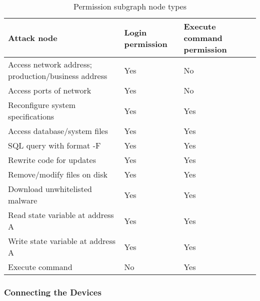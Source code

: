 \documentclass[10pt,journal,compsoc]{IEEEtran}
\begin{document}
\begin {table}[h]
\caption {Permission subgraph node types}
\begin{tabular}{|m{4.7cm}|m{1.5cm}|m{1.5cm}|}
\hline
\textbf{Attack node} & \textbf{Login permission} & \textbf{Execute command permission} \\ \hline
Access network address; production/business address & Yes & No \\ \hline
Access ports of network & Yes & No \\ \hline
Reconfigure system specifications & Yes & Yes \\ \hline
Access database/system files & Yes & Yes \\ \hline
SQL query with format -F & Yes & Yes \\ \hline
Rewrite code for updates & Yes & Yes \\ \hline
Remove/modify files on disk & Yes & Yes \\ \hline
Download unwhitelisted malware & Yes & Yes \\ \hline
Read state variable at address A & Yes & Yes \\ \hline
Write state variable at address A & Yes & Yes \\ \hline
Execute command & No & Yes \\ \hline
\end{tabular}
\label{fig:permission_subgraph_node_types}		
\end {table}

\subsubsection{Connecting the Devices}
\label{subsubsection:connect_the_devices}
\end{document}
